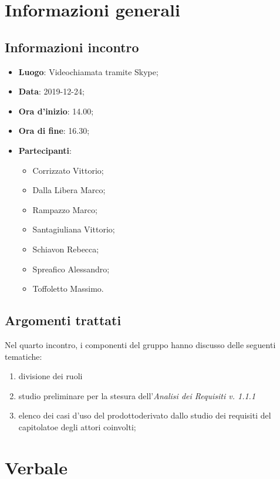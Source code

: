 \section{Informazioni generali}
    \subsection{Informazioni incontro}
        \begin{itemize}
            \item \textbf{Luogo}: Videochiamata tramite Skype;
            \item \textbf{Data}: 2019-12-24;
            \item \textbf{Ora d'inizio}: 14.00;
            \item \textbf{Ora di fine}: 16.30;
            \item \textbf{Partecipanti}: 
            \begin{itemize}
                \item Corrizzato Vittorio;
                \item Dalla Libera Marco;
                \item Rampazzo Marco;
                \item Santagiuliana Vittorio;
                \item Schiavon Rebecca;
                \item Spreafico Alessandro;
                \item Toffoletto Massimo.
            \end{itemize}
        \end{itemize}
    \subsection{Argomenti trattati}
        Nel quarto incontro, i componenti del gruppo hanno discusso delle seguenti tematiche:
        \begin{enumerate}
        	\item divisione dei ruoli 
        	\item studio preliminare per la stesura dell'\textit{Analisi dei Requisiti v. 1.1.1}
            \item elenco dei casi d'uso del prodotto\glosp derivato dallo studio dei requisiti del capitolato\glosp e degli attori coinvolti;
        \end{enumerate}
\section{Verbale}

